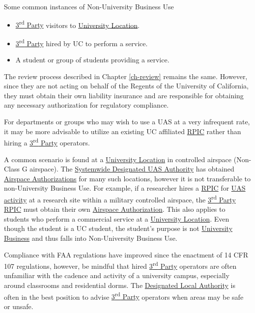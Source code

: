 \documentclass[
]{book}
\providecommand{\tightlist}{%
  \setlength{\itemsep}{0pt}\setlength{\parskip}{0pt}}
\begin{document}
Some common instances of Non-University Business Use

\begin{itemize}
\tightlist
\item
  \protect\hyperlink{rdparty}{3\textsuperscript{rd} Party} visitors to \protect\hyperlink{UL}{University Location}.
\item
  \protect\hyperlink{rdparty}{3\textsuperscript{rd} Party} hired by UC to perform a service.
\item
  A student or group of students providing a service.
\end{itemize}

The review process described in Chapter \ref{ch-review} remains the same. However, since they are not acting on behalf of the Regents of the University of California, they must obtain their own liability insurance and are responsible for obtaining any necessary authorization for regulatory compliance.

For departments or groups who may wish to use a UAS at a very infrequent rate, it may be more advisable to utilize an existing UC affiliated \protect\hyperlink{RPIC}{RPIC} rather than hiring a \protect\hyperlink{rdparty}{3\textsuperscript{rd} Party} operators.

A common scenario is found at a \protect\hyperlink{UL}{University Location} in controlled airspace (Non-Class G airspace). The \protect\hyperlink{SDA}{Systemwide Designated UAS Authority} has obtained \protect\hyperlink{AA}{Airspace Authorizations} for many such locations, however it is not transferable to non-University Business Use. For example, if a researcher hires a \protect\hyperlink{RPIC}{RPIC} for \protect\hyperlink{UASactivity}{UAS activity} at a research site within a military controlled airspace, the \protect\hyperlink{rdparty}{3\textsuperscript{rd} Party} \protect\hyperlink{RPIC}{RPIC} must obtain their own \protect\hyperlink{AA}{Airspace Authorization}. This also applies to students who perform a commercial service at a \protect\hyperlink{UL}{University Location}. Even though the student is a UC student, the student's purpose is not \protect\hyperlink{UB}{University Business} and thus falls into Non-University Business Use.

Compliance with FAA regulations have improved since the enactment of 14 CFR 107 regulations, however, be mindful that hired \protect\hyperlink{rdparty}{3\textsuperscript{rd} Party} operators are often unfamiliar with the cadence and activity of a university campus, especially around classrooms and residential dorms. The \protect\hyperlink{DLA}{Designated Local Authority} is often in the best position to advise \protect\hyperlink{rdparty}{3\textsuperscript{rd} Party} operators when areas may be safe or unsafe.
\end{document}
